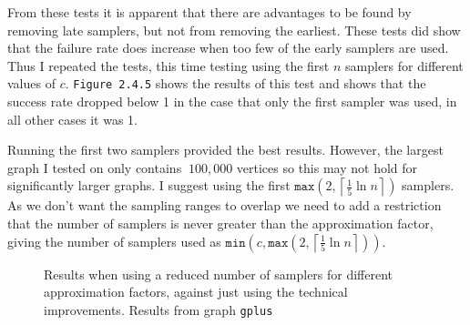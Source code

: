 \documentclass[11pt,twoside,a4paper]{report}
\begin{document}
\par From these tests it is apparent that there are advantages to be found by removing late samplers, but not from removing the earliest. These tests did show that the failure rate does increase when too few of the early samplers are used. Thus I repeated the tests, this time testing using the first $n$ samplers for different values of $c$. \texttt{Figure 2.4.5} shows the results of this test and shows that the success rate dropped below 1 in the case that only the first sampler was used, in all other cases it was 1.

\par Running the first two samplers provided the best results. However, the largest graph I tested on only contains $~100,000$ vertices so this may not hold for significantly larger graphs. I suggest using the first $\mathtt{max}\left(2,\left\lceil\frac15\ln n\right\rceil\right)$ samplers. As we don't want the sampling ranges to overlap we need to add a restriction that the number of samplers is never greater than the approximation factor, giving the number of samplers used as $\mathtt{min}\left(c,\mathtt{max}\left(2,\left\lceil\frac15\ln n\right\rceil\right)\right)$.

\begin{figure}[H]
	\label{Figure 7}
	\caption{Results when using a reduced number of samplers for different approximation factors, against just using the technical improvements. Results from graph \texttt{gplus}}
\end{figure}
\end{document}
